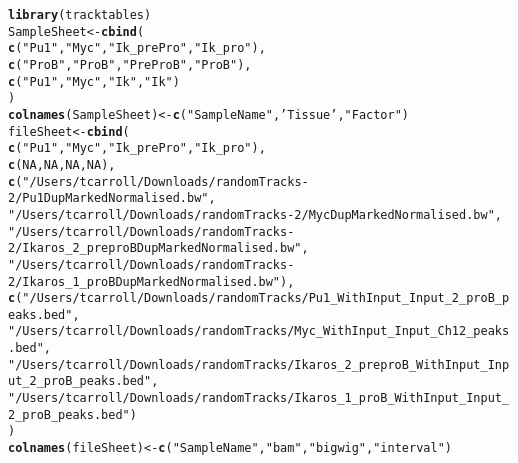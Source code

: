 \documentclass[12pt]{article}\usepackage[]{graphicx}\usepackage[usenames,dvipsnames]{color}
\makeatletter
\newcommand{\hlnum}[1]{\textcolor[rgb]{0.686,0.059,0.569}{#1}}%
\newcommand{\hlstr}[1]{\textcolor[rgb]{0.192,0.494,0.8}{#1}}%
\newcommand{\hlstd}[1]{\textcolor[rgb]{0.345,0.345,0.345}{#1}}%
\newcommand{\hlkwb}[1]{\textcolor[rgb]{0.69,0.353,0.396}{#1}}%
\newcommand{\hlkwd}[1]{\textcolor[rgb]{0.737,0.353,0.396}{\textbf{#1}}}%
\newenvironment{kframe}{%
 \def\at@end@of@kframe{}%
 \ifinner\ifhmode%
  \def\at@end@of@kframe{\end{minipage}}%
  \begin{minipage}{\columnwidth}%
 \fi\fi%
 \def\FrameCommand##1{\hskip\@totalleftmargin \hskip-\fboxsep
 \colorbox{shadecolor}{##1}\hskip-\fboxsep
     \hskip-\linewidth \hskip-\@totalleftmargin \hskip\columnwidth}%
 \MakeFramed {\advance\hsize-\width
   \@totalleftmargin\z@ \linewidth\hsize
   \@setminipage}}%
 {\par\unskip\endMakeFramed%
 \at@end@of@kframe}
\newenvironment{knitrout}{}{} %
\makeatother
\begin{document}
\begin{knitrout}
\color{fgcolor}\begin{kframe}
\begin{alltt}
\hlkwd{library}\hlstd{(tracktables)}
\hlstd{SampleSheet} \hlkwb{<-} \hlkwd{cbind}\hlstd{(}
  \hlkwd{c}\hlstd{(}\hlstr{"Pu1"}\hlstd{,}\hlstr{"Myc"}\hlstd{,}\hlstr{"Ik_prePro"}\hlstd{,}\hlstr{"Ik_pro"}\hlstd{),}
  \hlkwd{c}\hlstd{(}\hlstr{"ProB"}\hlstd{,}\hlstr{"ProB"}\hlstd{,}\hlstr{"PreProB"}\hlstd{,}\hlstr{"ProB"}\hlstd{),}
  \hlkwd{c}\hlstd{(}\hlstr{"Pu1"}\hlstd{,}\hlstr{"Myc"}\hlstd{,}\hlstr{"Ik"}\hlstd{,}\hlstr{"Ik"}\hlstd{)}
\hlstd{)}
\hlkwd{colnames}\hlstd{(SampleSheet)} \hlkwb{<-} \hlkwd{c}\hlstd{(}\hlstr{"SampleName"}\hlstd{,}\hlstr{'Tissue'}\hlstd{,}\hlstr{"Factor"}\hlstd{)}
\hlstd{fileSheet} \hlkwb{<-} \hlkwd{cbind}\hlstd{(}
  \hlkwd{c}\hlstd{(}\hlstr{"Pu1"}\hlstd{,}\hlstr{"Myc"}\hlstd{,}\hlstr{"Ik_prePro"}\hlstd{,}\hlstr{"Ik_pro"}\hlstd{),}
  \hlkwd{c}\hlstd{(}\hlnum{NA}\hlstd{,}\hlnum{NA}\hlstd{,}\hlnum{NA}\hlstd{,}\hlnum{NA}\hlstd{),}
  \hlkwd{c}\hlstd{(}\hlstr{"/Users/tcarroll/Downloads/randomTracks-2/Pu1DupMarkedNormalised.bw"}\hlstd{,}
    \hlstr{"/Users/tcarroll/Downloads/randomTracks-2/MycDupMarkedNormalised.bw"}\hlstd{,}
    \hlstr{"/Users/tcarroll/Downloads/randomTracks-2/Ikaros_2_preproBDupMarkedNormalised.bw"}\hlstd{,}
    \hlstr{"/Users/tcarroll/Downloads/randomTracks-2/Ikaros_1_proBDupMarkedNormalised.bw"}\hlstd{),}
  \hlkwd{c}\hlstd{(}\hlstr{"/Users/tcarroll/Downloads/randomTracks/Pu1_WithInput_Input_2_proB_peaks.bed"}\hlstd{,}
    \hlstr{"/Users/tcarroll/Downloads/randomTracks/Myc_WithInput_Input_Ch12_peaks.bed"}\hlstd{,}
    \hlstr{"/Users/tcarroll/Downloads/randomTracks/Ikaros_2_preproB_WithInput_Input_2_proB_peaks.bed"}\hlstd{,}
    \hlstr{"/Users/tcarroll/Downloads/randomTracks/Ikaros_1_proB_WithInput_Input_2_proB_peaks.bed"}\hlstd{)}
\hlstd{)}
\hlkwd{colnames}\hlstd{(fileSheet)} \hlkwb{<-} \hlkwd{c}\hlstd{(}\hlstr{"SampleName"}\hlstd{,}\hlstr{"bam"}\hlstd{,}\hlstr{"bigwig"}\hlstd{,}\hlstr{"interval"}\hlstd{)}
\end{alltt}
\end{kframe}
\end{knitrout}
\end{document}
